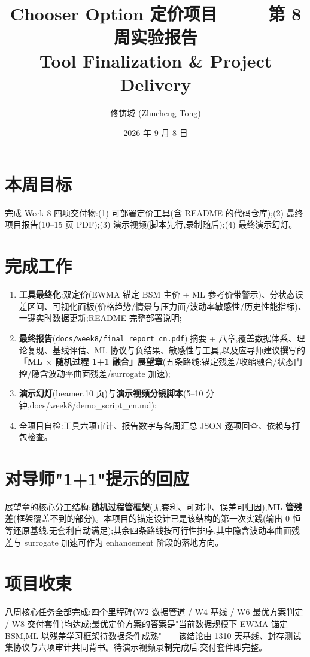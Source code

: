 \documentclass[11pt]{ctexart}
\title{\textbf{Chooser Option 定价项目 —— 第 8 周实验报告}\\
\large Tool Finalization \& Project Delivery}
\author{佟铸城 (Zhucheng Tong)}
\date{2026 年 9 月 8 日}
\begin{document}
\maketitle

\section{本周目标}
完成 Week 8 四项交付物:(1) 可部署定价工具(含 README 的代码仓库);(2) 最终项目报告(10--15 页 PDF);(3) 演示视频(脚本先行,录制随后);(4) 最终演示幻灯。

\section{完成工作}
\begin{enumerate}
  \item \textbf{工具最终化}:双定价(EWMA 锚定 BSM 主价 + ML 参考价带警示)、分状态误差区间、可视化面板(价格趋势/情景与压力面/波动率敏感性/历史性能指标)、一键实时数据更新;README 完整部署说明;
  \item \textbf{最终报告}(\texttt{docs/week8/final\_report\_cn.pdf}):摘要 + 八章,覆盖数据体系、理论复现、基线评估、ML 协议与负结果、敏感性与工具,以及应导师建议撰写的\textbf{「ML $\times$ 随机过程 1+1 融合」展望章}(五条路线:锚定残差/收缩融合/状态门控/隐含波动率曲面残差/surrogate 加速);
  \item \textbf{演示幻灯}(beamer,10 页)与\textbf{演示视频分镜脚本}(5--10 分钟,docs/week8/demo\_script\_cn.md);
  \item 全项目自检:工具六项审计、报告数字与各周汇总 JSON 逐项回查、依赖与打包检查。
\end{enumerate}

\section{对导师"1+1"提示的回应}
展望章的核心分工结构:\textbf{随机过程管框架}(无套利、可对冲、误差可归因),\textbf{ML 管残差}(框架覆盖不到的部分)。本项目的锚定设计已是该结构的第一次实践(输出 0 恒等还原基线,无套利自动满足);其余四条路线按可行性排序,其中隐含波动率曲面残差与 surrogate 加速可作为 enhancement 阶段的落地方向。

\section{项目收束}
八周核心任务全部完成:四个里程碑(W2 数据管道 / W4 基线 / W6 最优方案判定 / W8 交付套件)均达成;最优定价方案的答案是"当前数据规模下 EWMA 锚定 BSM,ML 以残差学习框架待数据条件成熟"——该结论由 1310 天基线、封存测试集协议与六项审计共同背书。待演示视频录制完成后,交付套件即完整。
\end{document}
